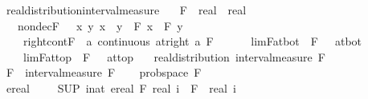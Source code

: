 \documentclass[leqno]{article}
\theoremstyle{definition}
\begin{document}
\begin{isabellebody}
\isamarkupfalse%
\ real{\isacharunderscore}distribution{\isacharunderscore}interval{\isacharunderscore}measure{\isacharcolon}\isanewline
\ \ \ F\ {\isacharcolon}{\isacharcolon}\ {\isachardoublequoteopen}real\ {\isasymRightarrow}\ real{\isachardoublequoteclose}\isanewline
\ \ \ nondecF\ {\isacharcolon}\ {\isachardoublequoteopen}{\isasymAnd}\ x\ y{\isachardot}\ x\ {\isasymle}\ y\ {\isasymLongrightarrow}\ F\ x\ {\isasymle}\ F\ y{\isachardoublequoteclose}\ \isanewline
\ \ \ \ right{\isacharunderscore}cont{\isacharunderscore}F\ {\isacharcolon}\ {\isachardoublequoteopen}{\isasymAnd}a{\isachardot}\ continuous\ {\isacharparenleft}at{\isacharunderscore}right\ a{\isacharparenright}\ F{\isachardoublequoteclose}\ \ \isanewline
\ \ \ \ lim{\isacharunderscore}F{\isacharunderscore}at{\isacharunderscore}bot\ {\isacharcolon}\ {\isachardoublequoteopen}{\isacharparenleft}F\ {\isacharminus}{\isacharminus}{\isacharminus}{\isachargreater}\ {}{\isacharparenright}\ at{\isacharunderscore}bot{\isachardoublequoteclose}\ \isanewline
\ \ \ \ lim{\isacharunderscore}F{\isacharunderscore}at{\isacharunderscore}top\ {\isacharcolon}\ {\isachardoublequoteopen}{\isacharparenleft}F\ {\isacharminus}{\isacharminus}{\isacharminus}{\isachargreater}\ {}{\isacharparenright}\ at{\isacharunderscore}top{\isachardoublequoteclose}\isanewline
\ \ \ {\isachardoublequoteopen}real{\isacharunderscore}distribution\ {\isacharparenleft}interval{\isacharunderscore}measure\ F{\isacharparenright}{\isachardoublequoteclose}\isanewline
{}\isamarkupfalse%
\ {\isacharminus}\isanewline
\ \ \isamarkupfalse%
\ {\isacharquery}F\ {\isacharequal}\ {\isachardoublequoteopen}interval{\isacharunderscore}measure\ F{\isachardoublequoteclose}\isanewline
\ \ \isamarkupfalse%
\ prob{\isacharunderscore}space\ {\isacharquery}F\isanewline
\ \ \isamarkupfalse%
\isanewline
\ \ \ \ \isamarkupfalse%
\ {\isachardoublequoteopen}ereal\ {\isacharparenleft}{}\ {\isacharminus}\ {}{\isacharparenright}\ {\isacharequal}\ {\isacharparenleft}SUP\ i{\isacharcolon}{\isacharcolon}nat{\isachardot}\ ereal\ {\isacharparenleft}F\ {\isacharparenleft}real\ i{\isacharparenright}\ {\isacharminus}\ F\ {\isacharparenleft}{\isacharminus}\ real\ i{\isacharparenright}{\isacharparenright}{\isacharparenright}{\isachardoublequoteclose}\isanewline
\ \ \ \ \ \ \isamarkupfalse%

\end{isabellebody}
\end{document}
